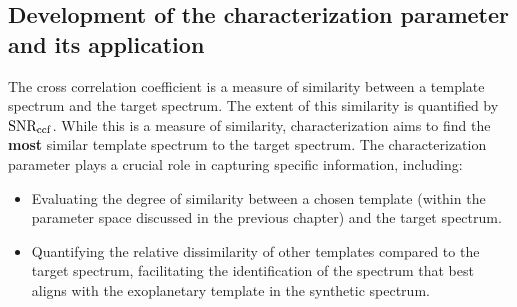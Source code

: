 \subsection{Development of the characterization parameter and its application}
The cross correlation coefficient is a measure of similarity between a template spectrum and the target spectrum.
The extent of this similarity is quantified by $\rm{SNR_{ccf}}$.
While this is a measure of similarity, characterization aims to find the \textbf{most} similar template spectrum to the target spectrum.
The characterization parameter plays a crucial role in capturing specific information, including:
\begin{itemize}
    \item 
    Evaluating the degree of similarity between a chosen template (within the parameter space discussed in the previous chapter) and the target spectrum.
    \item
    Quantifying the relative dissimilarity of other templates compared to the target spectrum, facilitating the identification of the spectrum that best aligns with the exoplanetary template in the synthetic spectrum.
\end{itemize}

